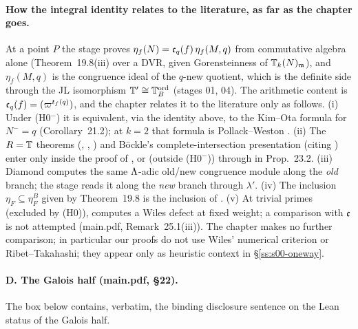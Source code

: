\paragraph{How the integral identity relates to the literature, as far as the chapter goes.} At a point $P$ the stage proves
$\eta_f(N)=\mathfrak{c}_q(f)\,\eta_f(M,q)$ from commutative algebra alone (Theorem~19.8(iii) over a DVR, given Gorensteinness of $\mathbb{T}_k(N)_{\mathfrak{m}}$), and
$\eta_f(M,q)$ is the congruence ideal of the $q$-new quotient, which is the definite side through the JL isomorphism $\mathbb{T}'\cong\mathbb{T}^{\mathrm{ord}}_B$
(stages 01, 04). The arithmetic content is $\mathfrak{c}_q(f)=(\varpi^{t_f(q)})$, and the chapter relates it to the literature only as follows.
(i) Under (H0$^-$) it is equivalent, via the identity above, to the Kim--Ota formula \cite[Thm~1.1]{KO} for $N^-=q$ (Corollary~21.2); at
$k=2$ that formula is Pollack--Weston \cite[Thm~6.8]{PW}. (ii) The $R=\mathbb{T}$ theorems (\cite[Thm~0.2]{DFG}, \cite[Thm~6.6]{Dim09},
\cite[Thm~2.9]{KO}) and B\"ockle's complete-intersection presentation \cite[Thm~3.12]{KO} (citing \cite{Boc07}) enter only inside the proof of
\cite{KO}, or (outside (H0$^-$)) through \cite[Thm~3.14]{KO} in Prop.~23.2. (iii) Diamond \cite[Thm~6B, p.~80]{Dia89} computes the same
$\Lambda$-adic old/new congruence module along the \emph{old} branch; the stage reads it along the \emph{new} branch through $\lambda'$.
(iv) The inclusion $\eta_F\subseteq\eta^B_F$ given by Theorem~19.8 is the inclusion of \cite[Rem.~7.8]{Hs}. (v) At trivial primes
(excluded by (H0)), \cite[Thm~1.2]{BKM} computes a Wiles defect at fixed weight; a comparison with $\mathfrak{c}$ is not attempted (main.pdf,
Remark~25.1(iii)). The chapter makes no further comparison; in particular our proofs do not use Wiles' numerical criterion or
Ribet--Takahashi; they appear only as heuristic context in \S\ref{ss:s00-oneway}.

\paragraph{D. The Galois half (main.pdf, \S22).} The box below contains, verbatim, the binding disclosure sentence on the Lean status
of the Galois half.

